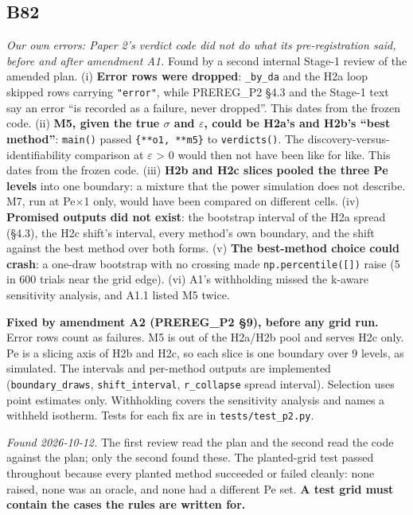 \documentclass[10pt]{article}
\begin{document}
\subsection*{B82}\label{led:B82}
\begin{description}[leftmargin=0pt,itemsep=1pt]
\item[Defect.] \emph{Our own errors: Paper 2's verdict code did not do what its pre-registration said, before and after amendment A1.} Found by a second internal Stage-1 review of the amended plan. (i) \textbf{Error rows were dropped}: \texttt{\_by\_da} and the H2a loop skipped rows carrying \texttt{"error"}, while PREREG\_P2 §4.3 and the Stage-1 text say an error ``is recorded as a failure, never dropped''. This dates from the frozen code. (ii) \textbf{M5, given the true $\sigma$ and $\varepsilon$, could be H2a's and H2b's ``best method''}: \texttt{main()} passed \texttt{\{**o1, **m5\}} to \texttt{verdicts()}. The discovery-versus-identifiability comparison at $\varepsilon$ > 0 would then not have been like for like. This dates from the frozen code. (iii) \textbf{H2b and H2c slices pooled the three Pe levels} into one boundary: a mixture that the power simulation does not describe. M7, run at Pe$\times$1 only, would have been compared on different cells. (iv) \textbf{Promised outputs did not exist}: the bootstrap interval of the H2a spread (§4.3), the H2c shift's interval, every method's own boundary, and the shift against the best method over both forms. (v) \textbf{The best-method choice could crash}: a one-draw bootstrap with no crossing made \texttt{np.percentile([])} raise (5 in 600 trials near the grid edge). (vi) A1's withholding missed the k-aware sensitivity analysis, and A1.1 listed M5 twice.
\item[Resolution.] \textbf{Fixed by amendment A2 (PREREG\_P2 §9), before any grid run.} Error rows count as failures. M5 is out of the H2a/H2b pool and serves H2c only. Pe is a slicing axis of H2b and H2c, so each slice is one boundary over 9 levels, as simulated. The intervals and per-method outputs are implemented (\texttt{boundary\_draws}, \texttt{shift\_interval}, \texttt{r\_collapse} spread interval). Selection uses point estimates only. Withholding covers the sensitivity analysis and names a withheld isotherm. Tests for each fix are in \texttt{tests/test\_p2.py}.
\item[Note.] \emph{Found 2026-10-12.} The first review read the plan and the second read the code against the plan; only the second found these. The planted-grid test passed throughout because every planted method succeeded or failed cleanly: none raised, none was an oracle, and none had a different Pe set. \textbf{A test grid must contain the cases the rules are written for.}
\end{description}
\end{document}

